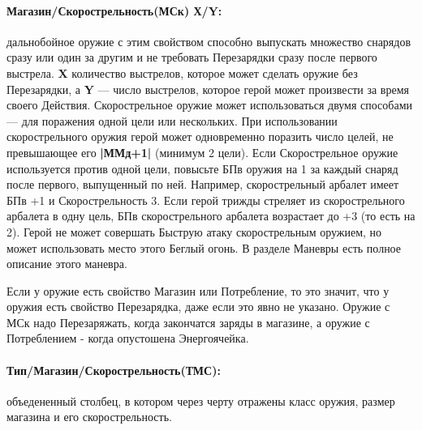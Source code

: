 \paragraph{Магазин/Скорострельность(МСк) Х/Y:} дальнобойное оружие с этим свойством способно выпускать множество снарядов сразу или один за другим и не требовать Перезарядки сразу после первого выстрела. \textbf{X} количество выстрелов, которое может сделать оружие без Перезарядки, а \textbf{Y} — число выстрелов, которое герой может произвести за время своего Действия. Скорострельное оружие может использоваться двумя способами — для поражения одной цели или нескольких. При использовании скорострельного оружия герой может одновременно поразить число целей, не превышающее его \textbf{|ММд+1|} (минимум 2 цели).
\newline
Если Скорострельное оружие используется против одной цели, повысьте БПв оружия на 1 за каждый снаряд после первого, выпущенный по ней. Например, скорострельный арбалет имеет БПв +1 и Скорострельность 3. Если герой трижды стреляет из скорострельного арбалета в одну цель, БПв скорострельного арбалета возрастает до +3 (то есть на 2).
Герой не может совершать Быструю атаку скорострельным оружием, но может использовать место этого Беглый огонь. В разделе Маневры есть полное описание этого маневра.
\begin{tcolorbox}
Если у оружие есть свойство Магазин или Потребление, то это значит, что у оружия есть свойство Перезарядка, даже если это явно не указано. Оружие с МСк надо Перезаряжать, когда закончатся заряды в магазине, а оружие с Потреблением - когда опустошена Энергоячейка.
\end{tcolorbox}
\paragraph{Тип/Магазин/Скорострельность(ТМС):} объедененный столбец, в котором через черту отражены класс оружия, размер магазина и его скорострельность.
